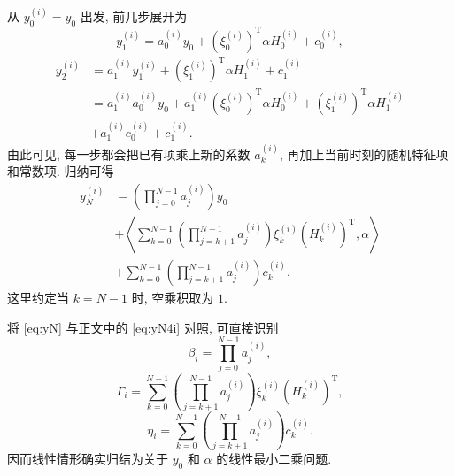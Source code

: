     从 $y_{0}^{(i)} = y_{0}$ 出发, 前几步展开为
    \begin{equation}
      y_{1}^{(i)}
      = a_{0}^{(i)} y_{0}
      + (\xi_{0}^{(i)})^{\operatorname{T}} \alpha H_{0}^{(i)}
      + c_{0}^{(i)},
      \label{eq:y1}
    \end{equation}
    \begin{equation}
      \begin{aligned}
        y_2^{(i)}
        &= a_{1}^{(i)} y_{1}^{(i)}
        + (\xi_{1}^{(i)})^{\operatorname{T}} \alpha H_{1}^{(i)}
        + c_{1}^{(i)} \\
        &= a_{1}^{(i)} a_{0}^{(i)} y_{0}
        + a_{1}^{(i)} (\xi_{0}^{(i)})^{\operatorname{T}} \alpha H_{0}^{(i)}
        + (\xi_{1}^{(i)})^{\operatorname{T}} \alpha H_{1}^{(i)} \\
        &+ a_{1}^{(i)} c_{0}^{(i)} + c_{1}^{(i)}.
      \end{aligned}
      \label{eq:y2}
    \end{equation}
    由此可见, 每一步都会把已有项乘上新的系数 $a_{k}^{(i)}$, 再加上当前时刻的随机特征项和常数项.
    归纳可得
    \begin{equation}
      \begin{aligned}
        y_{N}^{(i)}
        &= \left( \prod_{j = 0}^{N - 1} a_{j}^{(i)} \right) y_{0} \\
        &+ \left\langle
          \sum_{k = 0}^{N - 1} \left( \prod_{j = k + 1}^{N - 1} a_{j}^{(i)} \right)
          \xi_{k}^{(i)} (H_{k}^{(i)})^{\operatorname{T}},
          \alpha
        \right\rangle \\
        &+ \sum_{k = 0}^{N - 1} \left( \prod_{j = k + 1}^{N-1} a_{j}^{(i)} \right) c_{k}^{(i)}.
      \end{aligned}
      \label{eq:yN}
    \end{equation}
    这里约定当 $k = N - 1$ 时, 空乘积取为 $1$.

    将 \eqref{eq:yN} 与正文中的 \eqref{eq:yN4i} 对照, 可直接识别
    \begin{equation}
      \beta_{i} = \prod_{j = 0}^{N - 1} a_{j}^{(i)},
      \label{eq:beta}
    \end{equation}
    \begin{equation}
      \Gamma_{i} = \sum_{k = 0}^{N - 1}
      \left( \prod_{j = k + 1}^{N - 1} a_{j}^{(i)} \right)
      \xi_{k}^{(i)} (H_{k}^{(i)})^{\operatorname{T}},
      \label{eq:gamma}
    \end{equation}
    \begin{equation}
      \eta_{i} = \sum_{k=0}^{N-1}
      \left( \prod_{j=k+1}^{N-1} a_{j}^{(i)} \right) c_{k}^{(i)}.
      \label{eq:eta}
    \end{equation}
    因而线性情形确实归结为关于 $y_{0}$ 和 $\alpha$ 的线性最小二乘问题.

